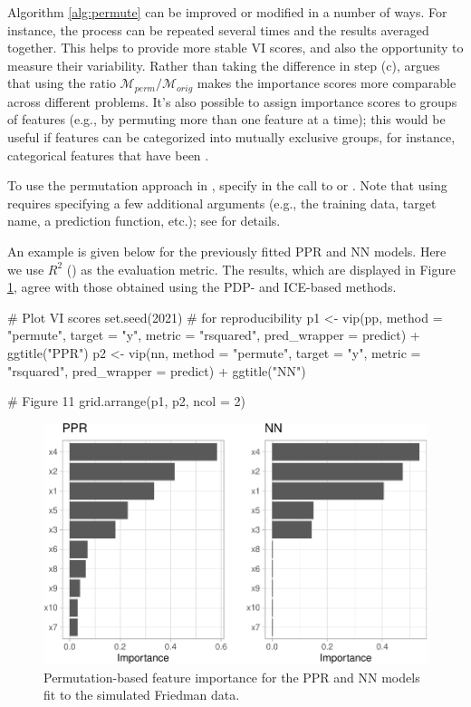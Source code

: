 Algorithm \ref{alg:permute} can be improved or modified in a number of
ways. For instance, the process can be repeated several times and the
results averaged together. This helps to provide more stable VI scores,
and also the opportunity to measure their variability. Rather than
taking the difference in step (c), \citet[sec. 5.5.4]{molnar-2019-iml}
argues that using the ratio \(\mathcal{M}_{perm} / \mathcal{M}_{orig}\)
makes the importance scores more comparable across different problems.
It's also possible to assign importance scores to groups of features
(e.g., by permuting more than one feature at a time); this would be
useful if features can be categorized into mutually exclusive groups,
for instance, categorical features that have been .

To use the permutation approach in , specify
 in the call to  or .
Note that using  requires specifying a few
additional arguments (e.g., the training data, target name, a prediction
function, etc.); see  for details.

An example is given below for the previously fitted PPR and NN models.
Here we use \(R^2\) () as the evaluation
metric. The results, which are displayed in Figure
\ref{fig:vip-permute-ppr-nn}, agree with those obtained using the PDP-
and ICE-based methods.

\begin{Schunk}
\begin{Sinput}
# Plot VI scores
set.seed(2021)  # for reproducibility
p1 <- vip(pp, method = "permute", target = "y", metric = "rsquared",
          pred_wrapper = predict) + ggtitle("PPR")
p2 <- vip(nn, method = "permute", target = "y", metric = "rsquared",
          pred_wrapper = predict) + ggtitle("NN")

# Figure 11
grid.arrange(p1, p2, ncol = 2)
\end{Sinput}
\begin{figure}[!htb]

{\centering \includegraphics[width=0.7\linewidth]{greenwell-boehmke_files/figure-latex/vip-permute-ppr-nn-1} 

}

\caption[Permutation-based feature importance for the PPR and NN models fit to the simulated Friedman data]{Permutation-based feature importance for the PPR and NN models fit to the simulated Friedman data.}\label{fig:vip-permute-ppr-nn}
\end{figure}
\end{Schunk}

